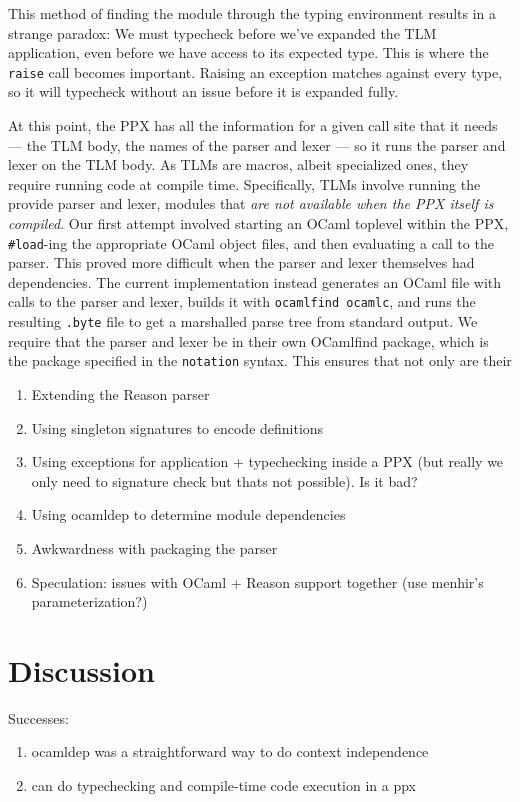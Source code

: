 \documentclass[acmsmall,review]{acmart}
\newcommand{\li}[1]{\lstinline[basicstyle=\ttfamily\fontsize{9pt}{1em}\selectfont]{#1}}
\theoremstyle{slplain}
\numberwithin{thm}{section}
\begin{document}
This method of finding the module through the typing environment results in a strange paradox: We must typecheck before we've expanded the TLM application, even before we have access to its expected type. This is where the \li{raise} call becomes important. Raising an exception matches against every type, so it will typecheck without an issue before it is expanded fully.

At this point, the PPX has all the information for a given call site that it needs --- the TLM body, the names of the parser and lexer --- so it runs the parser and lexer on the TLM body. As TLMs are macros, albeit specialized ones, they require running code at compile time. Specifically, TLMs involve running the provide parser and lexer, modules that {\it are not available when the PPX itself is compiled}. Our first attempt involved starting an OCaml toplevel within the PPX, \li{#load}-ing the appropriate OCaml object files, and then evaluating a call to the parser. This proved more difficult when the parser and lexer themselves had dependencies. The current implementation instead generates an OCaml file with calls to the parser and lexer, builds it with \li{ocamlfind ocamlc}, and runs the resulting \li{.byte} file to get a marshalled parse tree from standard output. We require that the parser and lexer be in their own OCamlfind package, which is the package specified in the \li{notation} syntax. This ensures that not only are their 

\begin{enumerate}
  \item Extending the Reason parser
  \item Using singleton signatures to encode definitions
  \item Using exceptions for application + typechecking inside a PPX (but really we only need to signature check but thats not possible). Is it bad?
  \item Using ocamldep to determine module dependencies
  \item Awkwardness with packaging the parser
  \item Speculation: issues with OCaml + Reason support together (use menhir's parameterization?)
\end{enumerate}
\section{Discussion}
Successes:
\begin{enumerate}
  \item ocamldep was a straightforward way to do context independence
  \item can do typechecking and compile-time code execution in a ppx
\end{enumerate}
\end{document}
